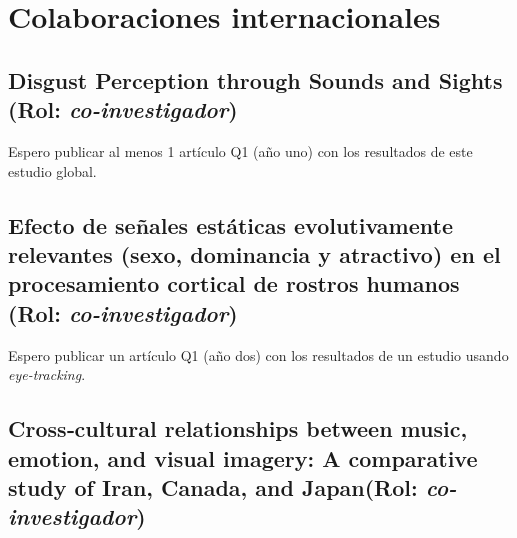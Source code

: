 \documentclass[11pt,a4paper,]{awesome-cv}
\begin{document}
\hypertarget{colaboraciones-internacionales}{%
\section{Colaboraciones
internacionales}\label{colaboraciones-internacionales}}

\hypertarget{disgust-perception-through-sounds-and-sights-rol-co-investigador}{%
\subsection{\texorpdfstring{Disgust Perception through Sounds and Sights
(Rol:
\emph{co-investigador})}{Disgust Perception through Sounds and Sights (Rol: co-investigador)}}\label{disgust-perception-through-sounds-and-sights-rol-co-investigador}}

\begin{footnotesize}

Espero publicar al menos 1 artículo Q1 (año uno) con los resultados de este estudio global.

\end{footnotesize}

\hypertarget{efecto-de-seuxf1ales-estuxe1ticas-evolutivamente-relevantes-sexo-dominancia-y-atractivo-en-el-procesamiento-cortical-de-rostros-humanos-rol-co-investigador}{%
\subsection{\texorpdfstring{Efecto de señales estáticas evolutivamente
relevantes (sexo, dominancia y atractivo) en el procesamiento cortical
de rostros humanos (Rol:
\emph{co-investigador})}{Efecto de señales estáticas evolutivamente relevantes (sexo, dominancia y atractivo) en el procesamiento cortical de rostros humanos (Rol: co-investigador)}}\label{efecto-de-seuxf1ales-estuxe1ticas-evolutivamente-relevantes-sexo-dominancia-y-atractivo-en-el-procesamiento-cortical-de-rostros-humanos-rol-co-investigador}}

\begin{footnotesize}

Espero publicar un artículo Q1 (año dos) con los resultados de un estudio usando \textit{eye-tracking}.

\end{footnotesize}

\hypertarget{crosscultural-relationships-between-music-emotion-and-visual-imagery-a-comparative-study-of-iran-canada-and-japanrol-co-investigador}{%
\subsection{\texorpdfstring{Cross‑cultural relationships between music,
emotion, and visual imagery: A comparative study of Iran, Canada, and
Japan(Rol:
\emph{co-investigador})}{Cross‑cultural relationships between music, emotion, and visual imagery: A comparative study of Iran, Canada, and Japan(Rol: co-investigador)}}\label{crosscultural-relationships-between-music-emotion-and-visual-imagery-a-comparative-study-of-iran-canada-and-japanrol-co-investigador}}
\end{document}
